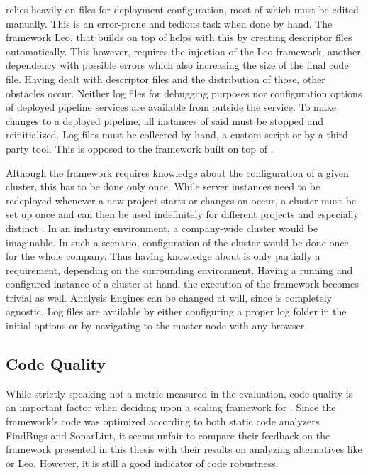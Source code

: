 \uimaas{} relies heavily on \xml{} files for deployment configuration, most of which must be edited manually. This is an error-prone and tedious task when done by hand. The framework Leo, that builds on top of \uimaas{} helps with this by creating \xml{} descriptor files automatically. This however, requires the injection of the Leo framework, another dependency with possible errors which also increasing the size of the final code file. Having dealt with \xml{} descriptor files and the distribution of those, other obstacles occur. Neither log files for debugging purposes nor configuration options of deployed pipeline services are available from outside the service. To make changes to a deployed pipeline, all instances of said \anen{} must be stopped and reinitialized. Log files must be collected by hand, a custom script or by a third party tool. This is opposed to the framework built on top of \spark{}.

Although the framework requires knowledge about the configuration of a given \spark{} cluster, this has to be done only once. While \uimaas{} server instances need to be redeployed whenever a new project starts or changes on \anens{} occur, a \spark{} cluster must be set up once and can then be used indefinitely for different projects and especially distinct \anens{}. In an industry environment, a company-wide \spark{} cluster would be imaginable. In such a scenario, configuration of the \spark{} cluster would be done once for the whole company. Thus having knowledge about \spark{} is only partially a requirement, depending on the surrounding environment. Having a running and configured instance of a \spark{} cluster at hand, the execution of the framework becomes trivial as well. Analysis Engines can be changed at will, since \spark{} is completely \uima{} agnostic. Log files are available by either configuring a proper log folder in the initial \spark{} options or by navigating to the \spark{} master node with any browser.
\subsection{Code Quality}
While strictly speaking not a metric measured in the evaluation, code quality is an important factor when deciding upon a scaling framework for \uima{}. Since the framework's code was optimized according to both static code analyzers FindBugs and SonarLint, it seems unfair to compare their feedback on the framework presented in this thesis with their results on analyzing alternatives like \uimaas{} or Leo. However, it is still a good indicator of code robustness.

